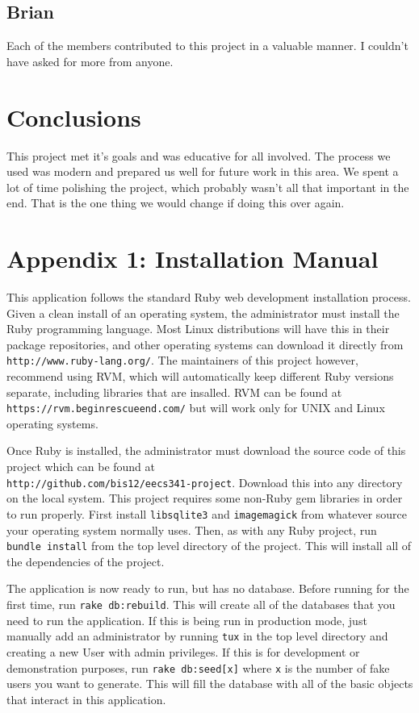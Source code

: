 \documentclass{acm_proc_article-sp}
\begin{document}
\subsection{Brian}
Each of the members contributed to this project in a valuable manner.  I couldn't have asked for more from anyone.
\section{Conclusions}
This project met it's goals and was educative for all involved.  The process we used was modern and prepared us well for future work in this area.  We spent a lot of time polishing the project, which probably wasn't all that important in the end.  That is the one thing we would change if doing this over again.
\section{Appendix 1: Installation Manual}
This application follows the standard Ruby web development installation process.  Given a clean install of an operating system, the administrator must install the Ruby programming language. Most Linux distributions will have this in their package repositories, and other operating systems can download it directly from \texttt{http://www.ruby-lang.org/}.  The maintainers of this project however, recommend using RVM, which will automatically keep different Ruby versions separate, including libraries that are insalled. RVM can be found at \texttt{https://rvm.beginrescueend.com/} but will work only for UNIX and Linux operating systems.  

Once Ruby is installed, the administrator must download the source code of this project which can be found at \\\texttt{http://github.com/bis12/eecs341-project}.  Download this into any directory on the local system.  This project requires some non-Ruby gem libraries in order to run properly.  First install \texttt{libsqlite3} and \texttt{imagemagick} from whatever source your operating system normally uses. Then, as with any Ruby project, run \texttt{bundle install} from the top level directory of the project. This will install all of the dependencies of the project.

The application is now ready to run, but has no database.  Before running for the first time,  run \texttt{rake db:rebuild}. This will create all of the databases that you need to run the application.  If this is being run in production mode, just manually add an administrator by running \texttt{tux} in the top level directory and creating a new User with admin privileges.  If this is for development or demonstration purposes, run \texttt{rake db:seed[x]} where \texttt{x} is the number of fake users you want to generate.  This will fill the database with all of the basic objects that interact in this application.  
\end{document}

